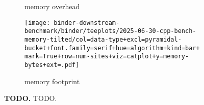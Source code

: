 \begin{figure*}

\begin{subfigure}{\linewidth}
    \centering
\resizebox{0.8\linewidth}{!}{%
%
}
\caption{memory overhead}
\label{fig:memory-supp:overhead}
\end{subfigure}

\begin{subfigure}{\linewidth}
\texttt{[image: binder-downstream-benchmark/binder/teeplots/2025-06-30-cpp-bench-memory-tilted/col=data-type+excl=pyramidal-bucket+font.family=serif+hue=algorithm+kind=bar+mark=True+row=num-sites+viz=catplot+y=memory-bytes+ext=.pdf]}
\caption{memory footprint}
\label{fig:memory-supp:footprint}
\end{subfigure}

\caption{%
\textbf{TODO.}
\small
TODO.
}
\label{fig:memory-supp}
\end{figure*}
